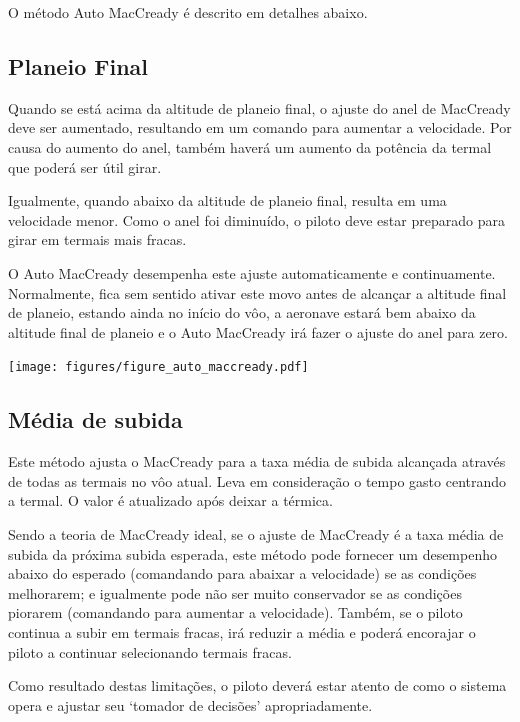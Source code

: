 O método Auto MacCready é descrito em detalhes abaixo.  

\subsection*{Planeio Final}

Quando se está acima da altitude de planeio final, o ajuste do anel de MacCready deve ser aumentado, resultando em um comando para aumentar a velocidade.  Por causa do aumento do anel, também haverá um aumento da potência da termal que poderá ser útil girar.

Igualmente, quando abaixo da altitude de planeio final, resulta em uma velocidade menor.  Como o anel foi diminuído, o piloto deve estar preparado para girar em termais mais fracas.

O Auto MacCready desempenha este ajuste automaticamente e continuamente.  Normalmente, fica sem sentido ativar este movo antes de alcançar a altitude final de planeio, estando ainda no início do vôo, a aeronave estará bem abaixo da altitude final de planeio e o Auto MacCready irá fazer o ajuste do anel para zero.  


\begin{maxipage}
\begin{center}
\texttt{[image: figures/figure\_auto\_maccready.pdf]}
\end{center}
\end{maxipage}


\subsection*{Média de subida}

Este método ajusta o MacCready para a taxa média de subida alcançada através de todas as termais no vôo atual.  Leva em consideração o tempo gasto centrando a termal.  O valor é atualizado após deixar a térmica.

Sendo a teoria de MacCready ideal, se o ajuste de MacCready é a taxa média de subida da próxima subida esperada, este método pode fornecer um desempenho abaixo do esperado (comandando para abaixar a velocidade) se as condições melhorarem; e igualmente pode não ser muito conservador se as condições piorarem (comandando para aumentar a velocidade).  Também, se o piloto continua a subir em termais fracas, irá reduzir a média e poderá encorajar o piloto a continuar selecionando termais fracas.

Como resultado destas limitações, o piloto deverá estar atento de como o sistema opera e ajustar seu ‘tomador de decisões’ apropriadamente.



